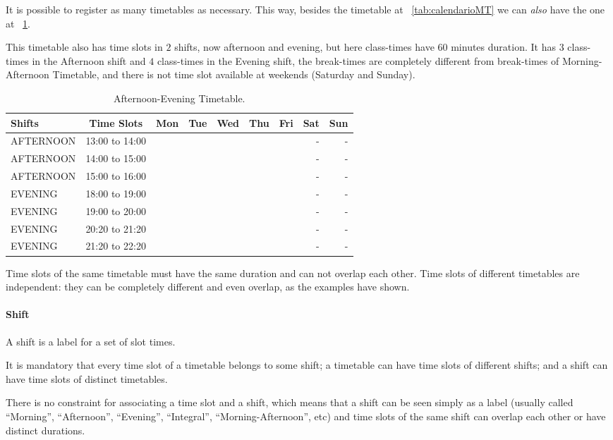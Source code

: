 It is possible to register as many timetables as necessary. This way, besides the timetable at ~\ref{tab:calendarioMT} we can \textit{also} have the one at ~\ref{tab:calendarioTN}. 

This timetable also has time slots in $2$ shifts, now afternoon and evening, but here class-times have $60$ minutes duration. It has $3$ class-times in the Afternoon shift and $4$ class-times in the Evening shift, the break-times are completely different from break-times of Morning-Afternoon Timetable, and there is not time slot available at weekends (Saturday and Sunday).


\begin{table}[H]
\centering
\begin{tabular}{l|c|r|r|r|r|r|r|r}
Shifts & Time Slots & Mon & Tue & Wed & Thu & Fri & Sat & Sun \\\hline
AFTERNOON & 13:00 to 14:00 & & & & & & - & - \\
AFTERNOON & 14:00 to 15:00 & & & & & & - & - \\
AFTERNOON & 15:00 to 16:00 & & & & & & - & - \\
EVENING & 18:00 to 19:00 & & & & & & - & - \\
EVENING & 19:00 to 20:00 & & & & & & - & - \\
EVENING & 20:20 to 21:20 & & & & & & - & - \\
EVENING & 21:20 to 22:20 & & & & & & - & -
\end{tabular}
\caption{\label{tab:calendarioTN}Afternoon-Evening Timetable.}
\end{table}


Time slots of the same timetable must have the same duration and can not overlap each other. Time slots of different timetables are independent: they can be completely different and even overlap, as the examples have shown.


\paragraph{Shift}
\label{defshift}

A shift is a label for a set of slot times.

It is mandatory that every time slot of a timetable belongs to some shift; a timetable can have time slots of different shifts; and a shift can have time slots of distinct timetables.

There is no constraint for associating a time slot and a shift, which means that a shift can be seen simply as a label (usually called ``Morning'', ``Afternoon'', ``Evening'', ``Integral'', ``Morning-Afternoon'', etc) and time slots of the same shift can overlap each other or have distinct durations.

